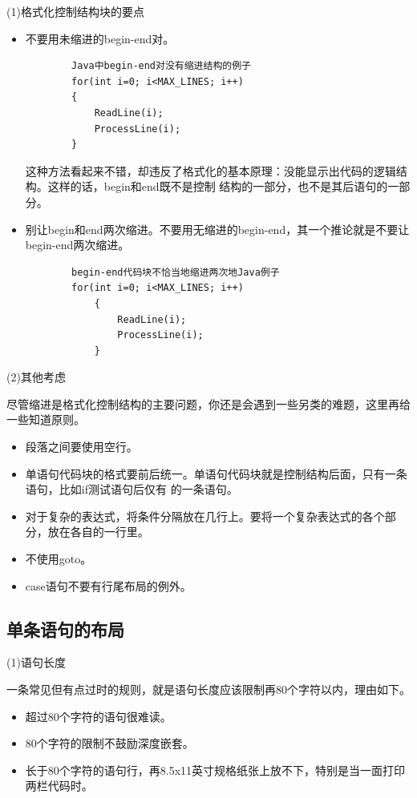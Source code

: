 \documentclass{article}
\begin{document}
\par
(1)格式化控制结构块的要点
\par
\begin{itemize}
    \item 不要用未缩进的begin-end对。
    \begin{lstlisting}
        Java中begin-end对没有缩进结构的例子
        for(int i=0; i<MAX_LINES; i++)
        {
            ReadLine(i);
            ProcessLine(i);
        }
    \end{lstlisting}
    这种方法看起来不错，却违反了格式化的基本原理：没能显示出代码的逻辑结构。这样的话，begin和end既不是控制
    结构的一部分，也不是其后语句的一部分。
    \item 别让begin和end两次缩进。不要用无缩进的begin-end，其一个推论就是不要让begin-end两次缩进。
    \begin{lstlisting}
        begin-end代码块不恰当地缩进两次地Java例子
        for(int i=0; i<MAX_LINES; i++)
            {
                ReadLine(i);
                ProcessLine(i);
            }
    \end{lstlisting}
\end{itemize}

\par
(2)其他考虑
\par
尽管缩进是格式化控制结构的主要问题，你还是会遇到一些另类的难题，这里再给一些知道原则。
\begin{itemize}
    \item 段落之间要使用空行。
    \item 单语句代码块的格式要前后统一。单语句代码块就是控制结构后面，只有一条语句，比如if测试语句后仅有
    的一条语句。
    \item 对于复杂的表达式，将条件分隔放在几行上。要将一个复杂表达式的各个部分，放在各自的一行里。
    \item 不使用goto。
    \item case语句不要有行尾布局的例外。
\end{itemize}

\subsection{单条语句的布局}
\par
(1)语句长度
\par
一条常见但有点过时的规则，就是语句长度应该限制再80个字符以内，理由如下。
\begin{itemize}
    \item 超过80个字符的语句很难读。
    \item 80个字符的限制不鼓励深度嵌套。
    \item 长于80个字符的语句行，再8.5x11英寸规格纸张上放不下，特别是当一面打印两栏代码时。
\end{itemize}
\end{document}
